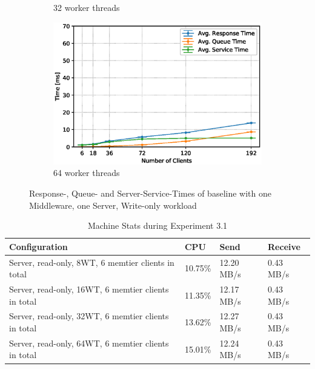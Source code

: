 \documentclass[11pt,a4paper]{article}
\begin{document}
\begin{figure}
\begin{subfigure}{.5\textwidth}
        \caption{32 worker threads}
    \end{subfigure}
    \begin{subfigure}{.5\textwidth}
        \includegraphics[width=1\linewidth]{plots/3_1b_extendedLatencyMiddleware_64w.eps}
        \caption{64 worker threads}
    \end{subfigure}

    \caption{Response-, Queue- and Server-Service-Times of baseline with one Middleware, one Server, Write-only workload}
    \label{fig:3-1-times-writeonly}
\end{figure}

\begin{center}
    \begin{table}
    	\begin{tabular}{|l|p{2cm}|p{2cm}|p{2cm}|}
            \hline \textbf{Configuration} & \textbf{CPU} & \textbf{Send} & \textbf{Receive}\\
            \hline Server, read-only, 8WT, 6 memtier clients in total & 10.75\%         & 12.20 MB/s    & 0.43 MB/s\\
            \hline Server, read-only, 16WT, 6 memtier clients in total & 11.35\%         & 12.17 MB/s    & 0.43 MB/s\\
            \hline Server, read-only, 32WT, 6 memtier clients in total & 13.62\%         & 12.27 MB/s    & 0.43 MB/s\\
            \hline Server, read-only, 64WT, 6 memtier clients in total & 15.01\%         & 12.24 MB/s    & 0.43 MB/s\\
            \hline
    	\end{tabular}
	\caption{Machine Stats during Experiment 3.1}
    \label{dstat:3-1}
	\end{table}
\end{center}
\end{document}
